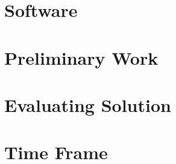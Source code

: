 \documentclass{article}
\begin{document}
\section*{Software}
\section*{Preliminary Work}
\section*{Evaluating Solution}
\section*{Time Frame}





\pagebreak


\end{document}
